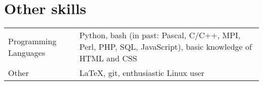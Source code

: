 \documentclass[a4paper, oneside, final]{scrartcl} %
\newcommand{\gray}{\rowcolor[gray]{.90}} %
\begin{document}
\section{Other skills}
\begin{tabularx}{0.97\linewidth}{>{\raggedleft}p{2.5cm}X}
  \gray  Programming Languages &  Python, bash (in past: Pascal, C/C++, MPI, Perl, PHP, SQL, JavaScript),
   basic knowledge of HTML and CSS\\
  Other & LaTeX, git, enthusiastic Linux user \\
\end{tabularx}


\end{document}
